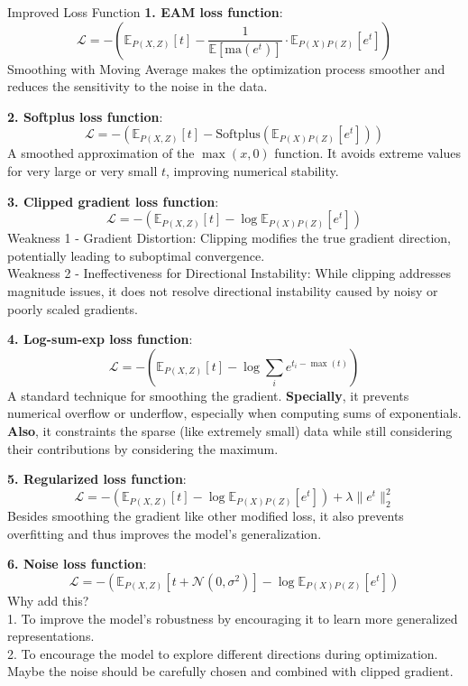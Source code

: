 \documentclass[final]{beamer}
\newlength{\colwidth}
\begin{document}
\begin{frame}[t]
\begin{columns}[t]
\begin{column}{\colwidth}
  \begin{block}{Improved Loss Function}
  \textbf{1. EAM loss function}:
  $$\mathcal L = - \left( \mathbb{E}_{P(X, Z)}[t] - \frac{1}{\mathbb{E}[\text{ma}(e^{t})]}\cdot \mathbb{E}_{P(X)P(Z)}\left[e^{t}\right] \right)$$
  Smoothing with Moving Average makes the optimization process smoother and reduces the sensitivity to the noise in the data.
  
  \textbf{2. Softplus loss function}:
  $$\mathcal{L} = - \left( \mathbb{E}_{P(X, Z)}[t] - \text{Softplus}\left(\mathbb{E}_{P(X)P(Z)}[e^t]\right) \right)$$
  A smoothed approximation of the $\max(x, 0)$ function. It avoids extreme values for very large or very small $t$, improving numerical stability.

  \textbf{3. Clipped gradient loss function}:
  $$\mathcal{L} = - \left( \mathbb{E}_{P(X, Z)}[t] - \log \mathbb{E}_{P(X)P(Z)}[e^t] \right)$$
  Weakness 1 - Gradient Distortion: Clipping modifies the true gradient direction, potentially leading to suboptimal convergence.\\
  Weakness 2 - Ineffectiveness for Directional Instability: While clipping addresses magnitude issues, it does not resolve directional instability caused by noisy or poorly scaled gradients.

  \textbf{4. Log-sum-exp loss function}:
  $$\mathcal{L} = - \left( \mathbb{E}_{P(X, Z)}[t] - \log \sum_{i} e^{t_i - \max(t)} \right)$$
  A standard technique for smoothing the gradient. \textbf{Specially}, it prevents numerical overflow or underflow, especially when computing sums of exponentials. \textbf{Also}, it constraints the sparse (like extremely small) data while still considering their contributions by considering the maximum.

  \textbf{5. Regularized loss function}:
  $$\mathcal{L} = - \left( \mathbb{E}_{P(X, Z)}[t] - \log \mathbb{E}_{P(X)P(Z)}[e^t] \right) + \lambda \|e^t\|_2^2$$
  Besides smoothing the gradient like other modified loss, it also prevents overfitting and thus improves the model's generalization.

  \textbf{6. Noise loss function}:
  $$\mathcal {L} = - \left( \mathbb{E}_{P(X, Z)}[t + \mathcal{N}(0, \sigma^2)] - \log \mathbb{E}_{P(X)P(Z)}[e^t] \right)$$
  Why add this?\\
  1. To improve the model’s robustness by encouraging it to learn more generalized representations.\\
  2. To encourage the model to explore different directions during optimization.\\
  Maybe the noise should be carefully chosen and combined with clipped gradient.


\end{block}
\end{column}
\end{columns}
\end{frame}
\end{document}
